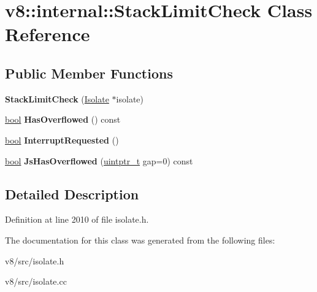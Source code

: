 \hypertarget{classv8_1_1internal_1_1StackLimitCheck}{}\section{v8\+:\+:internal\+:\+:Stack\+Limit\+Check Class Reference}
\label{classv8_1_1internal_1_1StackLimitCheck}
\subsection*{Public Member Functions}
\begin{DoxyCompactItemize}
\item 
\mbox{\label{classv8_1_1internal_1_1StackLimitCheck_a965cba8e0c4ccf4c08a07c616fdf1001}} 
{\bfseries Stack\+Limit\+Check} (\mbox{\hyperlink{classv8_1_1internal_1_1Isolate}{Isolate}} $\ast$isolate)
\item 
\mbox{\label{classv8_1_1internal_1_1StackLimitCheck_ad110a0a0b0a1e38e3811875ec45a4843}} 
\mbox{\hyperlink{classbool}{bool}} {\bfseries Has\+Overflowed} () const
\item 
\mbox{\label{classv8_1_1internal_1_1StackLimitCheck_a60021816393053e2f218da83bf402f39}} 
\mbox{\hyperlink{classbool}{bool}} {\bfseries Interrupt\+Requested} ()
\item 
\mbox{\label{classv8_1_1internal_1_1StackLimitCheck_a40c7532c8035444ef65343f6258ac201}} 
\mbox{\hyperlink{classbool}{bool}} {\bfseries Js\+Has\+Overflowed} (\mbox{\hyperlink{classuintptr__t}{uintptr\+\_\+t}} gap=0) const
\end{DoxyCompactItemize}


\subsection{Detailed Description}


Definition at line 2010 of file isolate.\+h.



The documentation for this class was generated from the following files\+:\begin{DoxyCompactItemize}
\item 
v8/src/isolate.\+h\item 
v8/src/isolate.\+cc\end{DoxyCompactItemize}
